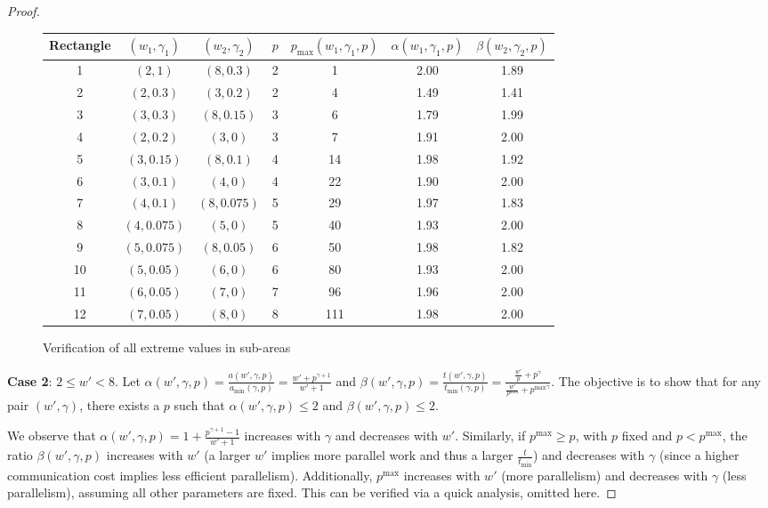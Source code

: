 \documentclass{article}
\begin{document}
\begin{proof}
\begin{figure}
\center
\begin{tabular}{|c|c|c|c|c|c|c|}
\hline
Rectangle & $(w_1,\gamma_1)$ & $(w_2,\gamma_2)$ & $p$ & $p_{\max}(w_1,\gamma_1,p) $& $\alpha(w_1,\gamma_1,p)$ & $\beta(w_2,\gamma_2,p)$ \\
\hline
1 & $(2,1)$ & $(8,0.3)$ & 2 &1 & 2.00 & 1.89 \\
2 & $(2,0.3)$ & $(3,0.2)$ & 2 &4 & 1.49 & 1.41 \\
3 & $(3,0.3)$ & $(8,0.15)$ & 3 &6 & 1.79 & 1.99 \\
4 & $(2,0.2)$ & $(3,0)$ & 3 &7 & 1.91 & 2.00 \\
5 & $(3,0.15)$ & $(8,0.1)$ & 4 &14 & 1.98 & 1.92 \\
6 & $(3,0.1)$ & $(4,0)$ & 4 &22 & 1.90 & 2.00 \\
7 & $(4,0.1)$ & $(8,0.075)$ & 5 &29 & 1.97 & 1.83 \\
8 & $(4,0.075)$ & $(5,0)$ & 5 &40 & 1.93 & 2.00 \\
9 & $(5,0.075)$ & $(8,0.05)$ & 6 &50 & 1.98 & 1.82 \\
10 & $(5,0.05)$ & $(6,0)$ & 6 &80 & 1.93 & 2.00 \\
11 & $(6,0.05)$ & $(7,0)$ & 7 &96 & 1.96 & 2.00 \\
12 & $(7,0.05)$ & $(8,0)$ & 8 &111 & 1.98 & 2.00 \\
\hline
\end{tabular}
\label{fig.verif}
\caption{Verification of all extreme values in sub-areas}
\end{figure}\textbf{Case 2}: $2 \leq w' < 8$.  
Let  $\alpha(w',\gamma,p)= \frac{a(w',\gamma,p)}{a_{\min}(\gamma,p)} = \frac{w' + p^{\gamma+1}}{w' + 1}$ and $\beta(w',\gamma,p) = \frac{t(w',\gamma,p)}{t_{\min}(\gamma,p)} = \frac{\frac{w'}{p} + p^\gamma}{\frac{w'}{p^{\max}} + {p^{\max}}^\gamma}$. The objective is to show that for any pair $(w',\gamma)$, there exists a $p$ such that $\alpha(w',\gamma,p) \leq 2$ and $\beta(w',\gamma,p) \leq 2$.

We observe that $\alpha(w',\gamma,p) = 1 + \frac{p^{\gamma+1} - 1}{w' + 1}$ increases with $\gamma$ and decreases with $w'$.  
Similarly, if $p^{\max} \geq p$, with $p$ fixed and $p < p^{\max}$, the ratio $\beta(w',\gamma,p)$ increases with $w'$ (a larger $w'$ implies more parallel work and thus a larger $\frac{t}{t_{\min}}$) and decreases with $\gamma$ (since a higher communication cost implies less efficient parallelism).  
Additionally, $p^{\max}$ increases with $w'$ (more parallelism) and decreases with $\gamma$ (less parallelism), assuming all other parameters are fixed. This can be verified via a quick analysis, omitted here.


\end{proof}
\end{document}
